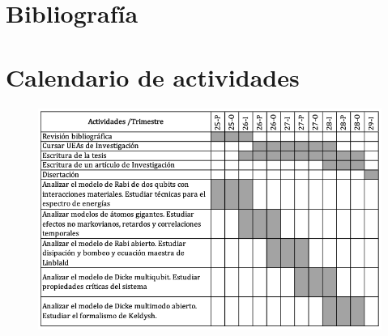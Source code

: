 \documentclass[onecolumn,notitlepage,letterpaper,aps,pra,12pt]{article}
\numberwithin{equation}{section}
\begin{document}
\section{Bibliografía}

\printbibliography[heading=none]
                

\section{Calendario de actividades}

\begin{figure}[H]
    \centering
    \includegraphics[width=1\linewidth]{Images/Calendario.png}
    \label{Calendario}
\end{figure}
\end{document}
